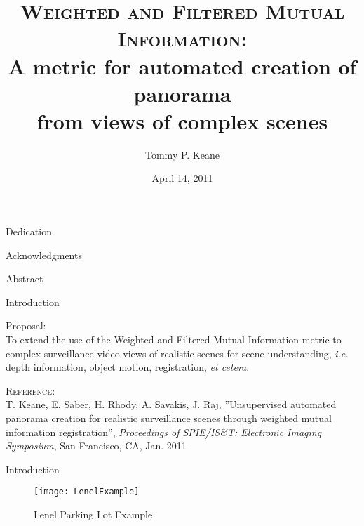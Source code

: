 \documentclass{beamer}
\title[M.S. Thesis: WFMI\hspace{10em}\insertframenumber{ }of \inserttotalframenumber]{\large\textsc{Weighted and Filtered Mutual Information}:
   \\
   A metric for automated creation of panorama\\from views of complex scenes}
\author{Tommy P. Keane}
\institute{Rochester Institute of Technology \\ Department of Electrical and Microelectronic Engineering}
\date{April 14, 2011}
\begin{document}
\begin{frame}
\titlepage
\end{frame}




\begin{frame}[c]{Dedication}

\end{frame}



\begin{frame}[c]{Acknowledgments}

\end{frame}



\begin{frame}[c]{Abstract}

\end{frame}



\begin{frame}[t]{\sc Introduction}
\begin{center}
{\sc Proposal}:
\\
\vfill
To extend the use of the Weighted and Filtered Mutual Information metric to complex surveillance video views of realistic scenes for scene understanding, \textit{i.e.} depth information, object motion, registration, \textit{et cetera}.
\\
\end{center}
\vfill
\textsc{Reference}:
\\
{\tiny T. Keane, E. Saber, H. Rhody, A. Savakis, J. Raj, ''Unsupervised automated panorama creation for realistic surveillance scenes through weighted mutual information registration'', \textit{Proceedings of SPIE/IS\&T: Electronic Imaging Symposium}, San Francisco, CA, Jan. 2011}
\end{frame}


\begin{frame}[c]{\sc Introduction}
\begin{center}

\begin{figure}[!h]
\centering
\texttt{[image: LenelExample]}
\caption{Lenel Parking Lot Example}
\label{LenelExample}
\end{figure}

\end{center}
\end{frame}
\end{document}
